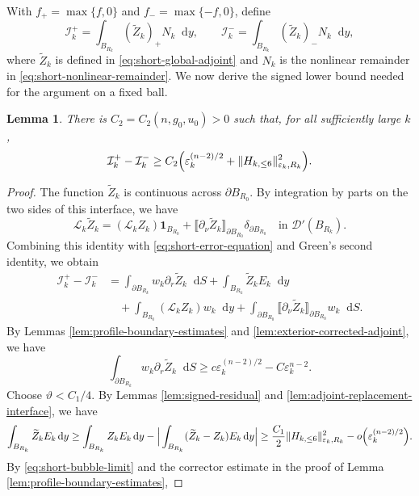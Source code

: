 \documentclass[11pt]{article}
\numberwithin{equation}{section}
\newtheorem{lemma}[theorem]{Lemma}
\theoremstyle{remark}
\newcommand{\dd}{\mathop{}\!\mathrm{d}}
\begin{document}
 With
$f_+=\max\{f,0\}$ and  $f_-=\max\{-f,0\}$, define
{
\[
 \mathcal I_k^+=\int_{B_{R_k}}(\widetilde Z_k)_+N_k\dd y,
 \qquad
 \mathcal I_k^-=\int_{B_{R_k}}(\widetilde Z_k)_-N_k\dd y,
\]
}
where $\widetilde Z_k$ is defined in \eqref{eq:short-global-adjoint} and $N_k$ is the nonlinear remainder in \eqref{eq:short-nonlinear-remainder}.
We now derive the signed lower bound needed for the argument on a fixed ball.
\begin{lemma}\label{lem:global-balance}
There is $C_2=C_2(n,g_0,u_0)>0$ such that, for all sufficiently large $k$,
{
\[
 \mathcal I_k^+-\mathcal I_k^-
 \ge C_2\Bigl(
 \varepsilon_k^{(n-2)/2}
 +\|H_{k,\le6}\|_{\varepsilon_k,R_k}^2\Bigr).
\]
}
\end{lemma}

 \begin{proof}
The function $\widetilde Z_k$ is continuous across
$\partial B_{R_0}$.  By integration by parts on the two sides of this
interface, we have
{
\[
 \mathcal L_k\widetilde Z_k
 =(\mathcal L_kZ_k)\mathbf1_{B_{R_0}}
 +\llbracket\partial_\nu\widetilde Z_k\rrbracket_{\partial B_{R_0}}
  \delta_{\partial B_{R_0}}
  \quad\text{in }\mathcal D'(B_{R_k}).
\]
}
Combining this identity with \eqref{eq:short-error-equation} and
Green's second identity, we obtain
{
\begin{equation}\label{eq:global-four-term-identity}
\begin{aligned}
 \mathcal I_k^+-\mathcal I_k^-&=
 \int_{\partial B_{R_k}}w_k\partial_r\widetilde Z_k\dd S
 +\int_{B_{R_k}}\widetilde Z_kE_k\dd y\\
 &\quad+\int_{B_{R_0}}(\mathcal L_kZ_k)w_k\dd y
 +\int_{\partial B_{R_0}}
 \llbracket\partial_\nu\widetilde Z_k\rrbracket_{\partial B_{R_0}}
 w_k\dd S.
\end{aligned}
\end{equation}
}
By Lemmas  \ref{lem:profile-boundary-estimates} and \ref{lem:exterior-corrected-adjoint}, we have
{
\[
 \int_{\partial B_{R_k}}w_k
 \partial_r\widetilde Z_k\dd S
 \ge c\varepsilon_k^{(n-2)/2}-C\varepsilon_k^{n-2}.
\]
}
Choose $\vartheta<C_1/4$.  By
Lemmas  \ref{lem:signed-residual} and
\ref{lem:adjoint-replacement-interface}, we have
{
\begin{align*}
 \int_{B_{R_k}}\widetilde Z_kE_k\dd y
 \ge\int_{B_{R_k}}Z_kE_k\dd y
 -\Big|\int_{B_{R_k}}(\widetilde Z_k-Z_k)E_k\dd y\Big|
 \ge\frac{C_1}{2}
 \|H_{k,\le6}\|_{\varepsilon_k,R_k}^2
 -o\Bigl(\varepsilon_k^{(n-2)/2}\Bigr).
\end{align*}
}
By \eqref{eq:short-bubble-limit} and the corrector
estimate in the proof of Lemma  \ref{lem:profile-boundary-estimates},

\end{proof}
\end{document}
